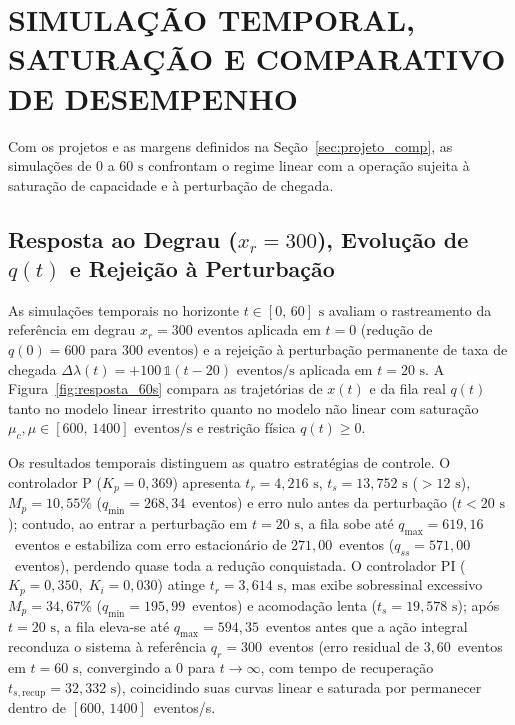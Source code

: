 \section{SIMULAÇÃO TEMPORAL, SATURAÇÃO E COMPARATIVO DE DESEMPENHO}\label{sec:simulacao}

Com os projetos e as margens definidos na Seção~\ref{sec:projeto_comp}, as simulações de $0$ a $60\text{ s}$ confrontam o regime linear com a operação sujeita à saturação de capacidade e à perturbação de chegada.

\subsection{Resposta ao Degrau ($x_r = 300$), Evolução de $q(t)$ e Rejeição à Perturbação}\label{sec:resp_60s}
As simulações temporais no horizonte $t \in [0,\,60]\text{ s}$ avaliam o rastreamento da referência em degrau $x_r = 300\text{ eventos}$ aplicada em $t = 0$ (redução de $q(0)=600$ para $300\text{ eventos}$) e a rejeição à perturbação permanente de taxa de chegada $\Delta\lambda(t) = +100\,\mathbb{1}(t - 20)\text{ eventos/s}$ aplicada em $t = 20\text{ s}$. A Figura~\ref{fig:resposta_60s} compara as trajetórias de $x(t)$ e da fila real $q(t)$ tanto no modelo linear irrestrito quanto no modelo não linear com saturação $\mu_c,\mu \in [600,\,1400]\text{ eventos/s}$ e restrição física $q(t) \ge 0$.

Os resultados temporais distinguem as quatro estratégias de controle. O controlador P ($K_p = 0{,}369$) apresenta $t_r = 4{,}216\text{ s}$, $t_s = 13{,}752\text{ s}$ ($> 12\text{ s}$), $M_p = 10{,}55\%$ ($q_{\min} = 268{,}34$~eventos) e erro nulo antes da perturbação ($t < 20\text{ s}$); contudo, ao entrar a perturbação em $t=20\text{ s}$, a fila sobe até $q_{\max} = 619{,}16$~eventos e estabiliza com erro estacionário de $271{,}00$~eventos ($q_{ss} = 571{,}00$~eventos), perdendo quase toda a redução conquistada. O controlador PI ($K_p = 0{,}350,\; K_i = 0{,}030$) atinge $t_r = 3{,}614\text{ s}$, mas exibe sobressinal excessivo $M_p = 34{,}67\%$ ($q_{\min} = 195{,}99$~eventos) e acomodação lenta ($t_s = 19{,}578\text{ s}$); após $t = 20\text{ s}$, a fila eleva-se até $q_{\max} = 594{,}35$~eventos antes que a ação integral reconduza o sistema à referência $q_r = 300$~eventos (erro residual de $3{,}60$~eventos em $t=60\text{ s}$, convergindo a $0$ para $t \to \infty$, com tempo de recuperação $t_{s,\text{recup}} = 32{,}332\text{ s}$), coincidindo suas curvas linear e saturada por permanecer dentro de $[600,\,1400]$~eventos/s.

